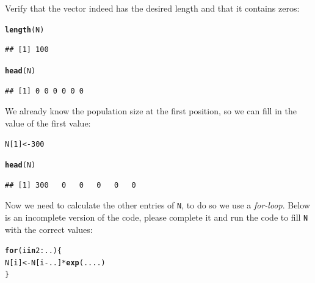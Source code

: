 \documentclass{article}\usepackage[]{graphicx}\usepackage[]{color}
\makeatletter
\newcommand{\hlnum}[1]{\textcolor[rgb]{0.686,0.059,0.569}{#1}}%
\newcommand{\hlopt}[1]{\textcolor[rgb]{0,0,0}{#1}}%
\newcommand{\hlstd}[1]{\textcolor[rgb]{0.345,0.345,0.345}{#1}}%
\newcommand{\hlkwa}[1]{\textcolor[rgb]{0.161,0.373,0.58}{\textbf{#1}}}%
\newcommand{\hlkwb}[1]{\textcolor[rgb]{0.69,0.353,0.396}{#1}}%
\newcommand{\hlkwd}[1]{\textcolor[rgb]{0.737,0.353,0.396}{\textbf{#1}}}%
\newenvironment{kframe}{%
 \def\at@end@of@kframe{}%
 \ifinner\ifhmode%
  \def\at@end@of@kframe{\end{minipage}}%
  \begin{minipage}{\columnwidth}%
 \fi\fi%
 \def\FrameCommand##1{\hskip\@totalleftmargin \hskip-\fboxsep
 \colorbox{shadecolor}{##1}\hskip-\fboxsep
     \hskip-\linewidth \hskip-\@totalleftmargin \hskip\columnwidth}%
 \MakeFramed {\advance\hsize-\width
   \@totalleftmargin\z@ \linewidth\hsize
   \@setminipage}}%
 {\par\unskip\endMakeFramed%
 \at@end@of@kframe}
\newenvironment{knitrout}{}{} %
\makeatother
\begin{document}
Verify that the vector indeed has the desired length and that it contains zeros: 
\begin{knitrout}
\color{fgcolor}\begin{kframe}
\begin{alltt}
\hlkwd{length}\hlstd{(N)}
\end{alltt}
\begin{verbatim}
## [1] 100
\end{verbatim}
\begin{alltt}
\hlkwd{head}\hlstd{(N)}
\end{alltt}
\begin{verbatim}
## [1] 0 0 0 0 0 0
\end{verbatim}
\end{kframe}
\end{knitrout}
We already know the population size at the first position, so we can fill in the value of the first value:
\begin{knitrout}
\color{fgcolor}\begin{kframe}
\begin{alltt}
\hlstd{N[}\hlnum{1}\hlstd{]}\hlkwb{<-}\hlnum{300}

\hlkwd{head}\hlstd{(N)}
\end{alltt}
\begin{verbatim}
## [1] 300   0   0   0   0   0
\end{verbatim}
\end{kframe}
\end{knitrout}
Now we need to calculate the other entries of \texttt{N}, to do so we use a \textit{for-loop}. Below is an incomplete version of the code, please complete it and run the code to fill \texttt{N} with the correct values:
\begin{knitrout}
\color{fgcolor}\begin{kframe}
\begin{alltt}
\hlkwa{for}\hlstd{(i} \hlkwa{in} \hlnum{2}\hlopt{:}\hlstd{..)\{}
  \hlstd{N[i]}\hlkwb{<-}\hlstd{N[i}\hlopt{-}\hlstd{..]}\hlopt{*}\hlkwd{exp}\hlstd{(....)}
\hlstd{\}}
\end{alltt}
\end{kframe}
\end{knitrout}
\end{document}
